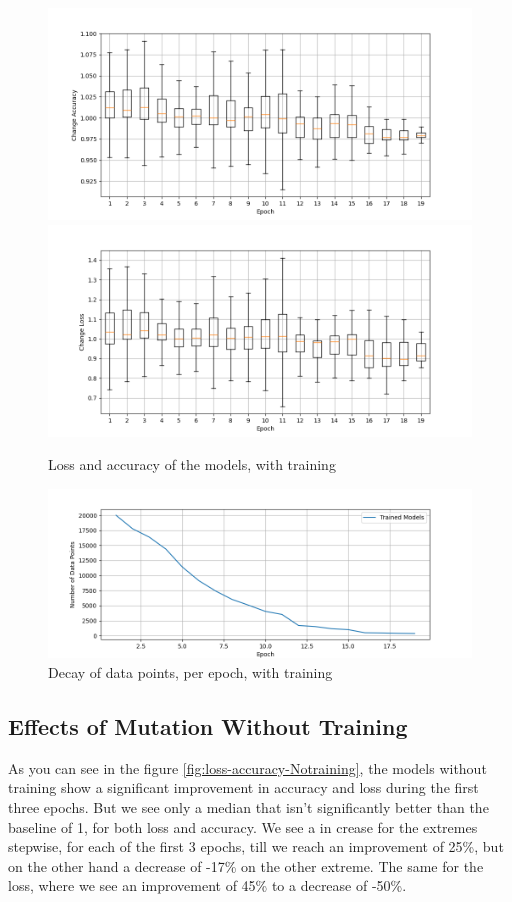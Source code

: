 \begin{figure}
    \centering
    \includegraphics[width=\textwidth]{plots/Trained_Change_Acc.png}
    \includegraphics[width=\textwidth]{plots/Trained_Change_Loss.png}
    \caption{Loss and accuracy of the models, with training}
    \label{fig:loss-accuracy-training}
\end{figure}
\begin{figure}
    \centering
    \includegraphics[width=\textwidth]{plots/Trained_Points_perEpoch.png}
    \caption{Decay of data points, per epoch, with training}
    \label{fig:decay_training}
\end{figure}
\subsection{Effects of Mutation Without Training}\label{subsec:effects-of-mutation-without-training}
As you can see in the figure \ref{fig:loss-accuracy-Notraining}, the models without training show a significant improvement in accuracy and loss during the first three epochs.
But we see only a median that isn't significantly better than the baseline of 1, for both loss and accuracy.
We see a in crease for the extremes stepwise, for each of the first 3 epochs, till we reach an improvement of 25\%, but on the other hand a decrease of -17\% on the other extreme.
The same for the loss, where we see an improvement of 45\% to a decrease of -50\%.


